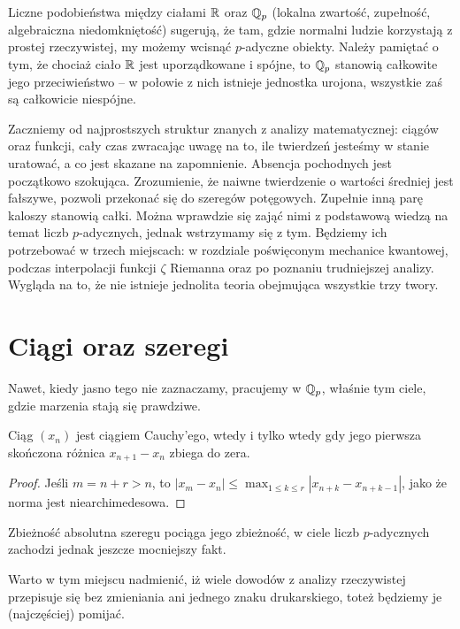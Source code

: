 Liczne podobieństwa między ciałami $\mathbb R$ oraz $\mathbb Q_p$ (lokalna zwartość, zupełność, algebraiczna niedomkniętość) sugerują, że tam, gdzie normalni ludzie korzystają z prostej rzeczywistej, my możemy wcisnąć $p$-adyczne obiekty.
Należy pamiętać o tym, że chociaż ciało $\mathbb R$ jest uporządkowane i spójne, to $\mathbb Q_p$ stanowią całkowite jego przeciwieństwo -- w połowie z nich istnieje jednostka urojona, wszystkie zaś są całkowicie niespójne.

Zaczniemy od najprostszych struktur znanych z analizy matematycznej: ciągów oraz funkcji, cały czas zwracając uwagę na to, ile twierdzeń jesteśmy w stanie uratować, a co jest skazane na zapomnienie.
Absencja pochodnych jest początkowo szokująca.
Zrozumienie, że naiwne twierdzenie o wartości średniej jest fałszywe, pozwoli przekonać się do szeregów potęgowych.
Zupełnie inną parę kaloszy stanowią całki.
Można wprawdzie się zająć nimi z podstawową wiedzą na temat liczb $p$-adycznych, jednak wstrzymamy się z tym.
Będziemy ich potrzebować w trzech miejscach: w rozdziale poświęconym mechanice kwantowej, podczas interpolacji funkcji $\zeta$ Riemanna oraz po poznaniu trudniejszej analizy.
Wygląda na to, że nie istnieje jednolita teoria obejmująca wszystkie trzy twory.

\section{Ciągi oraz szeregi}
Nawet,  kiedy jasno tego nie zaznaczamy, pracujemy w $\mathbb Q_p$, właśnie tym ciele, gdzie marzenia stają się prawdziwe.

\begin{fakt} \label{reginald}
	Ciąg $(x_n)$ jest ciągiem Cauchy'ego, wtedy i tylko wtedy gdy jego pierwsza skończona różnica $x_{n+1} - x_n$ zbiega do zera.
\end{fakt}

\begin{proof}
	Jeśli $m = n+r > n$, to $|x_m - x_n| \le \max_{1 \le k \le r} |x_{n+k}-x_{n+k-1}|$, jako że norma jest niearchimedesowa.
\end{proof}

Zbieżność absolutna szeregu pociąga jego zbieżność, w ciele liczb $p$-adycznych zachodzi jednak jeszcze mocniejszy fakt.

Warto w tym miejscu nadmienić, iż wiele dowodów z analizy rzeczywistej przepisuje się bez zmieniania ani jednego znaku drukarskiego, toteż będziemy je (najczęściej) pomijać.

